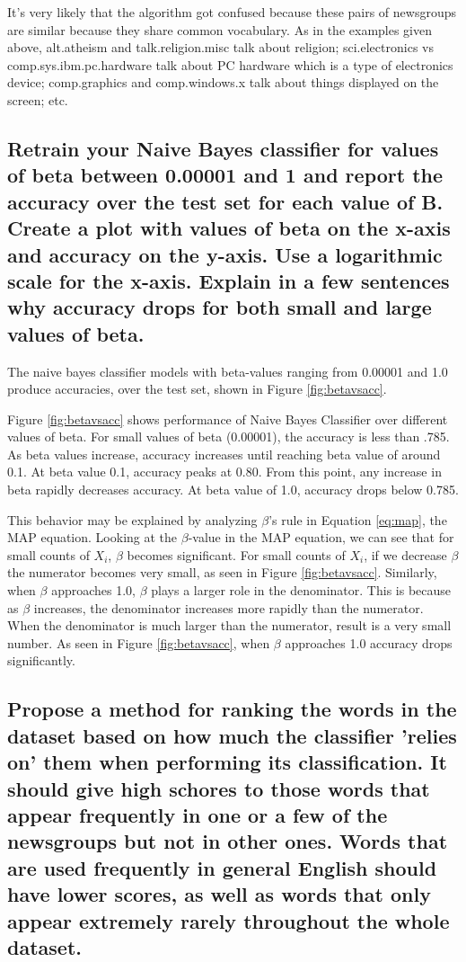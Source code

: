 \documentclass{IEEEtran}
\begin{document}
It's very likely that the algorithm got confused because these pairs of newsgroups are similar because they share common vocabulary. As in the examples given above, alt.atheism and talk.religion.misc talk about religion; sci.electronics vs comp.sys.ibm.pc.hardware talk about PC hardware which is a type of electronics device; comp.graphics and comp.windows.x talk about things displayed on the screen; etc.


\subsection{Retrain your Naive Bayes classifier for values of beta between 0.00001 and 1 and report the accuracy over the test set for each value of B. Create a plot with values of beta on the x-axis and accuracy on the y-axis. Use a logarithmic scale for the x-axis. Explain in a few sentences why accuracy drops for both small and large values of beta.}
The naive bayes classifier models with beta-values ranging from 0.00001 and 1.0 produce accuracies, over the test set, shown in Figure \ref{fig:betavsacc}.

Figure \ref{fig:betavsacc} shows performance of Naive Bayes Classifier over different values of beta. For small values of beta (0.00001), the accuracy is less than .785. As beta values increase, accuracy increases until reaching beta value of around 0.1. At beta value 0.1, accuracy peaks at 0.80. From this point, any increase in beta rapidly decreases accuracy. At beta value of 1.0, accuracy drops below 0.785.


This behavior may be explained by analyzing $\beta$'s rule in Equation \ref{eq:map}, the MAP equation. Looking at the $\beta$-value in the MAP equation, we can see that for small counts of $X_i$, $\beta$ becomes significant. For small counts of $X_i$, if we decrease $\beta$ the numerator becomes very small, as seen in Figure \ref{fig:betavsacc}. Similarly, when $\beta$ approaches 1.0, $\beta$ plays a larger role in the denominator. This is because as $\beta$ increases, the denominator increases more rapidly than the numerator. When the denominator is much larger than the numerator, result is a very small number. As seen in Figure \ref{fig:betavsacc}, when $\beta$ approaches 1.0 accuracy drops significantly.

\subsection{Propose a method for ranking the words in the dataset based on how much the classifier 'relies on' them when performing its classification. It should give high schores to those words that appear frequently in one or a few of the newsgroups but not in other ones. Words that are used frequently in general English should have lower scores, as well as words that only appear extremely rarely throughout the whole dataset.}
\end{document}
